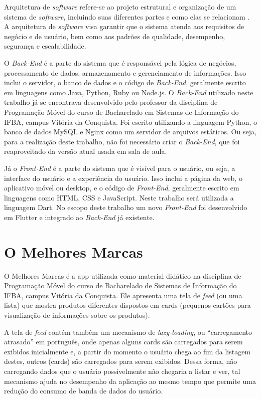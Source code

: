 \documentclass[12pt]{article}
\begin{document}
Arquitetura de \textit{software} refere-se ao projeto estrutural e organização de um sistema de \textit{software}, incluindo suas diferentes partes e como elas se relacionam \cite{ref_4}. A arquitetura de \textit{software} visa garantir que o sistema atenda aos requisitos de negócio e de usuário, bem como aos padrões de qualidade, desempenho, segurança e escalabilidade. 

O \textit{Back-End} é a parte do sistema que é responsável pela lógica de negócios, processamento de dados, armazenamento e gerenciamento de informações. Isso inclui o servidor, o banco de dados e o código de \textit{Back-End}, geralmente escrito em linguagens como Java, Python, Ruby ou Node.js. O \textit{Back-End} utilizado neste trabalho já se encontrava desenvolvido pelo professor da disciplina de Programação Móvel do curso de Bacharelado em Sistemas de Informação do IFBA, campus Vitória da Conquista. Foi escrito utilizando a linguagem Python, o banco de dados MySQL e Nginx como um servidor de arquivos estáticos. Ou seja, para a realização deste trabalho, não foi necessário criar o \textit{Back-End}, que foi reaproveitado da versão atual usada em sala de aula.

Já o \textit{Front-End} é a parte do sistema que é visível para o usuário, ou seja, a interface do usuário e a experiência do usuário. Isso inclui a página da web, o aplicativo móvel ou desktop, e o código de \textit{Front-End}, geralmente escrito em linguagens como HTML, CSS e JavaScript. Neste trabalho será utilizada a linguagem Dart. No escopo deste trabalho um novo \textit{Front-End} foi desenvolvido em Flutter e integrado ao \textit{Back-End} já existente.

\section{O Melhores Marcas} \label{sec:marcas}

O Melhores Marcas é a app utilizada como material didático na disciplina de Programação Móvel do curso de Bacharelado de Sistemas de Informação do IFBA, campus Vitória da Conquista. Ele apresenta uma tela de \textit{feed} (ou uma lista) que mostra produtos diferentes dispostos em cards (pequenos cartões para visualização de informações sobre os produtos).

A tela de \textit{feed} contém também um mecanismo de \textit{lazy-loading}, ou “carregamento atrasado” em português, onde apenas alguns cards são carregados para serem exibidos inicialmente e, a partir do momento o usuário chega ao fim da listagem destes, outros (cards) são carregados para serem exibidos. Dessa forma, não carregando dados que o usuário possivelmente não chegaria a listar e ver, tal mecanismo ajuda no desempenho da aplicação ao mesmo tempo que permite uma redução do consumo de banda de dados do usuário. 
\end{document}
